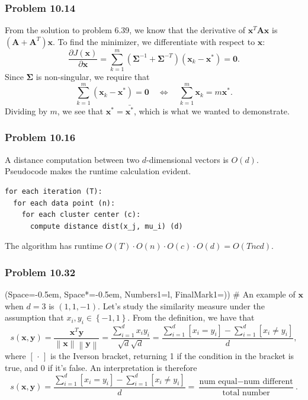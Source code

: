 \documentclass[12pt, a4paper]{article}
\newcommand{\listSpace}{-0.5em}%
\newcommand{\vect}[1]{\bm{#1}}
\newcommand{\norm}[1]{\left\lVert#1\right\rVert}
\begin{document}
{\subsubsection*{Problem 10.14}
From the solution to problem 6.39, we know that the derivative of $\vect{x}^T \vect{A} \vect{x}$ is $(\vect{A} + \vect{A}^T)\vect{x}$.
To find the minimizer, we differentiate with respect to $\vect{x}$:
\begin{equation*}
	\frac{\partial J(\vect{x})}{\partial \vect{x}} = \sum_{k=1}^{m}
	\left( \vect{\Sigma}^{-1} + \vect{\Sigma}^{-T} \right)
	\left( \vect{x}_k - \vect{x}^* \right) = \vect{0}.
\end{equation*}
Since $\vect{\Sigma}$ is non-singular, we require that 
\begin{equation*}
	\sum_{k=1}^{m}
	\left( \vect{x}_k - \vect{x}^* \right) = \vect{0}
	\quad 
	\Leftrightarrow
	\quad 
	\sum_{k=1}^{m}
	 \vect{x}_k  = m \vect{x}^*.
\end{equation*}
Dividing by $m$, we see that $\vect{x}^* = \bar{\vect{x}^*}$, which is what we wanted to demonstrate.






\subsubsection*{Problem 10.16}
A distance computation between two $d$-dimensional vectors is $O(d)$.
Pseudocode makes the runtime calculation evident.
\begin{Verbatim}
for each iteration (T):
  for each data point (n):
    for each cluster center (c):
      compute distance dist(x_j, mu_i) (d)
\end{Verbatim}
The algorithm has runtime $O(T) \cdot O(n) \cdot O(c) \cdot O(d) = O(Tncd)$.






\subsubsection*{Problem 10.32}
\begin{easylist}[enumerate]
\ListProperties(Space=\listSpace, Space*=\listSpace, Numbers1=l, FinalMark1={)})
# An example of $\vect{x}$ when $d=3$ is $(1, 1, -1)$.
Let's study the similarity measure under the assumption that $x_i, y_i \in \left\{-1, 1\right\}$.
From the definition, we have that
\begin{equation*}
	s(\vect{x}, \vect{y}) = \frac{\vect{x}^T \vect{y}}{\norm{\vect{x}} \norm{\vect{y}}}
	=
	\frac{\sum_{i=1}^{d} x_i y_i}{\sqrt{d} \sqrt{d}}
	=
	\frac{\sum_{i=1}^{d} \left[ x_i = y_i \right] - \sum_{i=1}^{d} \left[ x_i \neq y_i \right]}{d},
\end{equation*}
where $\left[ \, \cdot \,  \right]$ is the Iverson bracket, returning 1 if the condition in the bracket is true, and 0 if it's false.
An interpretation is therefore
\begin{equation*}
s(\vect{x}, \vect{y}) 
= 
\frac{\sum_{i=1}^{d} \left[ x_i = y_i \right] - \sum_{i=1}^{d} \left[ x_i \neq y_i \right]}{d}
= \frac{\text{num equal} - \text{num different}}{\text{total number}}.
\end{equation*}


\end{easylist}}
\end{document}
